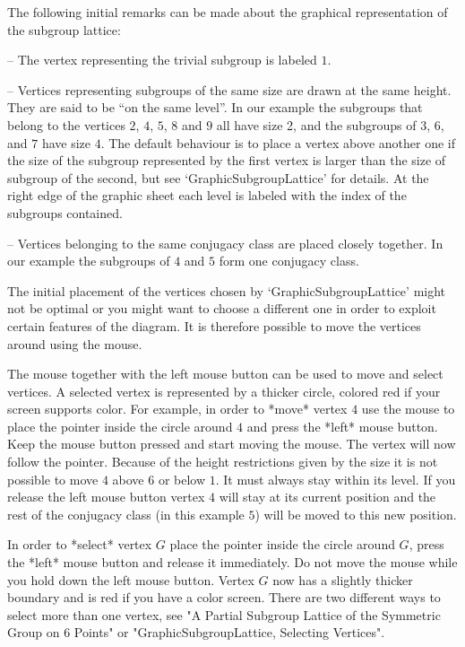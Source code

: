 The   following initial  remarks  can    be  made  about  the   graphical
representation of the subgroup lattice:

\beginlist
\item{--} The vertex representing the trivial subgroup is labeled $1$.
  
\item{--} Vertices representing subgroups of the same size are drawn at the
  same height. They are said to be ``on the same level''.  In our example
  the subgroups that belong to the vertices $2$, $4$, $5$, $8$ and $9$ all
  have size 2, and the subgroups of $3$, $6$, and $7$ have size $4$.  The
  default behaviour is to place a vertex above another one if the size of
  the subgroup represented by the first vertex is larger than the size of
  subgroup of the second, but see `GraphicSubgroupLattice' for details. At
  the right edge of the graphic sheet each level is labeled with the index
  of the subgroups contained.
  
\item{--} Vertices belonging to the same conjugacy class are placed closely
  together.  In our example the subgroups of $4$ and $5$ form one conjugacy
  class.
\endlist

The initial placement of the vertices chosen by `GraphicSubgroupLattice'
might not be optimal or you might want to choose a different one in order
to exploit certain features of the diagram.  It is therefore possible to
move the vertices around using the mouse.

The mouse together with the left mouse button can be used to move and
select vertices. A selected vertex is represented by a thicker circle,
colored red if your screen supports color.  For example, in order to *move*
vertex $4$ use the mouse to place the pointer inside the circle around $4$
and press the *left* mouse button.  Keep the mouse button pressed and start
moving the mouse.  The vertex will now follow the pointer.  Because of the
height restrictions given by the size it is not possible to move $4$ above
$6$ or below $1$. It must always stay within its level. If you release the
left mouse button vertex $4$ will stay at its current position and the rest
of the conjugacy class (in this example $5$) will be moved to this new
position.

In order to *select* vertex $G$ place the pointer inside the circle around
$G$, press the *left* mouse button and release it immediately.  Do not
move the mouse while you hold down the left mouse button.  Vertex $G$ now
has a slightly thicker boundary and is red if you have a color screen.
There are two different ways to select more than one vertex, see "A Partial
Subgroup Lattice of the Symmetric Group on 6 Points" or
"GraphicSubgroupLattice, Selecting Vertices".

